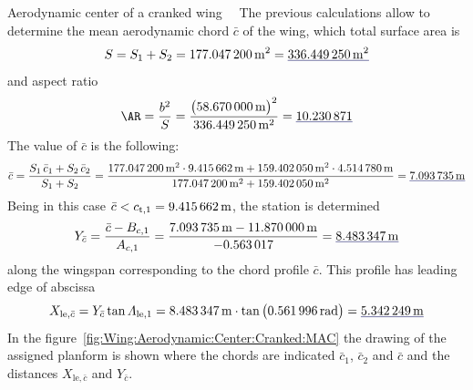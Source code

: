 \documentclass[[12pt,twoside]{book}
\begin{document}
\begin{myExampleX}{Aerodynamic center of a cranked wing}{\ \myIconGraph\ }
The previous calculations allow to determine the mean aerodynamic chord $\bar{c}$ of the wing,
which total surface area is
\[
S = S_1 + S_2
  = \SI[round-precision=1]{\myAreaWingIMTsquared}{\metre^2}
    = \mathunderline{mydarkblue}{
      \SI[round-precision=1]{\myAreaWingCrankedMTsquared}{\metre^2}
    }
\]
and aspect ratio
\[
\AR = \frac{b^2}{S} 
    = \frac{
        \big( \SI[round-precision=2]{\mySpanWingMT}{\meter} \big)^2
      }{
        \SI[round-precision=1]{\myAreaWingCrankedMTsquared}{\metre^2}
      }
    = \mathunderline{mydarkblue}{
      \SI[round-precision=2]{\myAspectRatioWingCranked}{}
    }
\]
The value of $\bar{c}$ is the following:
\[
\bar{c} = \frac{S_1 \, \bar{c}_1 + S_2 \, \bar{c}_2} {S_1 + S_2}
  =
  \frac{\SI[round-precision=1]{\myAreaWingIMTsquared}{\metre^2} \cdot \SI[round-precision=2]{\myMACWingIMT}{\metre} + \SI[round-precision=1]{\myAreaWingIIMTsquared}{\metre^2} \cdot \SI[round-precision=2]{\myMACWingIIMT}{\metre}}{\SI[round-precision=1]{\myAreaWingIMTsquared}{\metre^2} + \SI[round-precision=1]{\myAreaWingIIMTsquared}{\metre^2}}
    = \mathunderline{mydarkblue}{ \SI[round-precision=2]{\myMACWingCrankedMT}{\metre} }
\]
Being in this case
$\bar{c} < c_{\mathrm{t},1}=\SI[round-precision=2]{\myMACWingIMT}{\metre}$,
the station is determined
\[
  Y_{\bar{c}} 
    = \frac{\bar{c} - B_{c,1}}{A_{c,1}}
    = \frac{
        \SI[round-precision=2]{\myMACWingCrankedMT}{\metre} 
        - \SI[round-precision=2]{\myCoeffBChordWingIMT}{\metre}
      }{
        \SI[round-precision=3]{\myCoeffAChordWingI}{}
      }
    = \mathunderline{mydarkblue}{
      \SI[round-precision=2]{\myYYMACWingCrankedMT}{\metre}
    }
\]
along the wingspan corresponding to the chord profile $\bar{c}$. This profile
has leading edge of abscissa
\[
X_{\mathrm{le},\bar{c}} 
  = Y_{\bar{c}} \tan \Lambda_{\mathrm{le},1}
  =
   \SI[round-precision=2]{\myYYMACWingCrankedMT}{\metre}
   \cdot
	\tan \big( \SI[round-precision=3]{\mySweepLEWingIRAD}{\radian} \big)
	= \mathunderline{mydarkblue}{ \SI[round-precision=2]{\myXXMACLEToApexWingCrankedMT}{\metre} }
\]
% 
In the figure~\ref{fig:Wing:Aerodynamic:Center:Cranked:MAC}
the drawing of the assigned planform is shown where the chords are indicated $\bar{c}_1$, $\bar{c}_2$ and $\bar{c}$
and the distances $X_{\mathrm{le},\bar{c}}$ and $Y_{\bar{c}}$.


\end{myExampleX}
\end{document}

